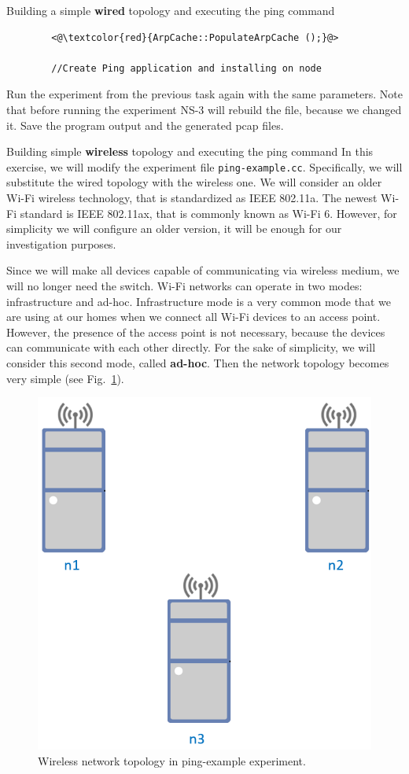 \begin{exercise}{Building a simple \textbf{wired} topology and executing the ping command}
\begin{enumerate}
\begin{lstlisting}
		<@\textcolor{red}{ArpCache::PopulateArpCache ();}@>
		
		//Create Ping application and installing on node 
		\end{lstlisting}
		Run the experiment from the previous task again with the same parameters. Note that before running the experiment NS-3 will rebuild the file, because we changed it. Save the program output and the generated pcap files.
		
	\end{enumerate}
\end{exercise}

\begin{exercise}{Building simple \textbf{wireless} topology and executing the ping command}
	In this exercise, we will modify the experiment file \nolinkurl{ping-example.cc}. Specifically, we will substitute the wired topology with the wireless one. We will consider an older Wi-Fi wireless technology, that is standardized as IEEE 802.11a. The newest Wi-Fi standard is IEEE 802.11ax, that is commonly known as Wi-Fi 6. However, for simplicity we will configure an older version, it will be enough for our investigation purposes. 
	
	Since we will make all devices capable of communicating via wireless medium, we will no longer need the switch. Wi-Fi networks can operate in two modes: infrastructure and ad-hoc. Infrastructure mode is a very common mode that we are using at our homes when we connect all Wi-Fi devices to an access point. However, the presence of the access point is not necessary, because the devices can communicate with each other directly. For the sake of simplicity, we will consider this second mode, called \textbf{ad-hoc}. Then the network topology becomes very simple (see Fig.~\ref{fig:lab7-ping-wireless}).
	\begin{figure}[ht]
		\centering
		\includegraphics[width=0.5\linewidth]{graphics/ping-wireless-topology}	
		\caption{Wireless network topology in ping-example experiment.}
		\label{fig:lab7-ping-wireless}
	\end{figure}
	

\end{exercise}
